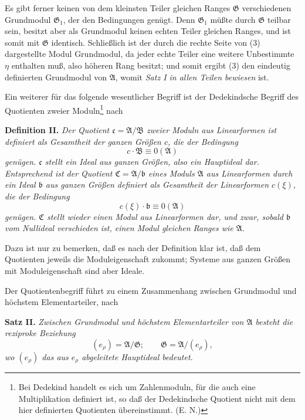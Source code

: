 \documentclass[11pt]{article}
\newcommand{\Amod}{\mathfrak A}
\newcommand{\Bmod}{\mathfrak B}
\newcommand{\Gmod}{\mathfrak G}
\newcommand{\bb}{\mathfrak b}
\newcommand{\cc}{\mathfrak c}
\newcommand{\zero}[1]{\equiv 0(#1)}
\begin{document}
Es gibt ferner keinen von dem kleinsten Teiler gleichen Ranges $\Gmod$ verschiedenen Grundmodul $\Gmod_1$, der den Bedingungen genügt. Denn $\Gmod_1$ müßte durch $\Gmod$ teilbar sein, besitzt aber als Grundmodul keinen echten Teiler gleichen Ranges, und ist somit mit $\Gmod$ identisch. Schließlich ist der durch die rechte Seite von (3) dargestellte Modul Grundmodul, da jeder echte Teiler eine weitere Unbestimmte $\eta$ enthalten muß, also höheren Rang besitzt; und somit ergibt (3) den eindeutig definierten Grundmodul von $\Amod$, womit \emph{Satz I in allen Teilen bewiesen} ist.

Ein weiterer für das folgende wesentlicher Begriff ist der Dedekindsche Begriff des Quotienten zweier Moduln\footnote{Bei Dedekind handelt es sich um Zahlenmoduln, für die auch eine Multiplikation definiert ist, so daß der Dedekindsche Quotient nicht mit dem hier definierten Quotienten übereinstimmt. (E. N.)} nach

\medskip
\noindent\textbf{Definition II.} \emph{Der Quotient $\cc=\Amod/\Bmod$ zweier Moduln aus Linearformen ist definiert als Gesamtheit der ganzen Größen $c$, die der Bedingung}
\[
 c\cdot\Bmod\zero{\Amod}
\]
\emph{genügen. $\cc$ stellt ein Ideal aus ganzen Größen, also ein Hauptideal dar. Entsprechend ist der Quotient $\mathfrak C=\Amod/\bb$ eines Moduls $\Amod$ aus Linearformen durch ein Ideal $\bb$ aus ganzen Größen definiert als Gesamtheit der Linearformen $c(\xi)$, die der Bedingung}
\[
 c(\xi)\cdot\bb\zero{\Amod}
\]
\emph{genügen. $\mathfrak C$ stellt wieder einen Modul aus Linearformen dar, und zwar, sobald $\bb$ vom Nullideal verschieden ist, einen Modul gleichen Ranges wie $\Amod$.}

Dazu ist nur zu bemerken, daß es nach der Definition klar ist, daß dem Quotienten jeweils die Moduleigenschaft zukommt; Systeme aus ganzen Größen mit Moduleigenschaft sind aber Ideale.

Der Quotientenbegriff führt zu einem Zusammenhang zwischen Grundmodul und höchstem Elementarteiler, nach

\medskip
\noindent\textbf{Satz II.} \emph{Zwischen Grundmodul und höchstem Elementarteiler von $\Amod$ besteht die reziproke Beziehung}
\begin{equation}
 (e_\rho)=\Amod/\Gmod;\qquad \Gmod=\Amod/(e_\rho),
\tag{5}
\end{equation}
\emph{wo $(e_\rho)$ das aus $e_\rho$ abgeleitete Hauptideal bedeutet.}
\end{document}
